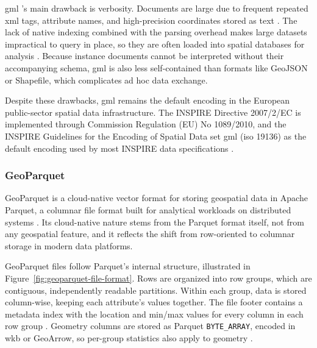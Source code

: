 \acrshort{gml} 's main drawback is verbosity. Documents are large due to frequent repeated \acrshort{xml} tags, attribute names, and high-precision coordinates stored as text \parencite{guo2010_effective_gml_documents_compressor}. The lack of native indexing combined with the parsing overhead makes large datasets impractical to query in place, so they are often loaded into spatial databases for analysis \parencite{li2004_gml_storage_spatial_database}. Because instance documents cannot be interpreted without their accompanying schema, \acrshort{gml} is also less self-contained than formats like GeoJSON or Shapefile, which complicates ad hoc data exchange.

Despite these drawbacks, \acrshort{gml} remains the default encoding in the European public-sector spatial data infrastructure. The INSPIRE Directive 2007/2/EC is implemented through Commission Regulation (EU) No 1089/2010, and the INSPIRE Guidelines for the Encoding of Spatial Data set \acrshort{gml} (\acrshort{iso} 19136) as the default encoding used by most INSPIRE data specifications \parencite{inspire2023_d27_encoding_guidelines, ec2010_commission_regulation_1089_inspire}.

\subsubsection{GeoParquet}
GeoParquet is a cloud-native vector format for storing geospatial data in Apache Parquet, a columnar file format built for analytical workloads on distributed systems \parencite{ogc2024_geoparquet_specification_v110, lamb2022_querying_parquet_millisecond_latency}. Its cloud-native nature stems from the Parquet format itself, not from any geospatial feature, and it reflects the shift from row-oriented to columnar storage in modern data platforms.

GeoParquet files follow Parquet's internal structure, illustrated in Figure~\ref{fig:geoparquet-file-format}. Rows are organized into row groups, which are contiguous, independently readable partitions. Within each group, data is stored column-wise, keeping each attribute's values together. The file footer contains a metadata index with the location and min/max values for every column in each row group \parencite{lamb2022_querying_parquet_millisecond_latency}. Geometry columns are stored as Parquet \texttt{BYTE\_ARRAY}, encoded in \acrfull{wkb} or GeoArrow, so per-group statistics also apply to geometry \parencite{ogc2024_geoparquet_specification_v110}.

